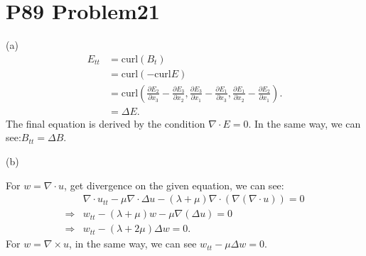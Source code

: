 \documentclass[a4paper]{ctexart}
\newcommand{\pdfFrac}[2]{\frac{\partial #1}{\partial #2}}
\begin{document}
\section*{P89 Problem21}
(a)
\begin{equation}
    \label{eq:Maxwell}
    \begin{aligned}
        E_{tt}&=\text{curl}(B_{t})\\
        &=\text{curl}(-\text{curl}E)\\
        &=\text{curl}(\pdfFrac{E_{2}}{x_{3}}-\pdfFrac{E_{3}}{x_{2}},\pdfFrac{E_{3}}{x_{1}}-\pdfFrac{E_{1}}{x_{3}},\pdfFrac{E_{1}}{x_{2}}-\pdfFrac{E_{2}}{x_{1}}).\\
        &=\Delta E.
    \end{aligned}
\end{equation}
The final equation is derived by the condition $\nabla\cdot E=0$. In the same way, we can see:$B_{tt}=\Delta B$.

(b)

For $w=\nabla\cdot u$, get divergence on the given equation, we can see:
\begin{equation}
    \begin{aligned}
        &\nabla\cdot u_{tt}-\mu\nabla\cdot\Delta u-(\lambda+\mu)\nabla\cdot(\nabla(\nabla\cdot u))=0\\
        \Rightarrow&w_{tt}-(\lambda+\mu)w-\mu\nabla(\Delta u)=0\\
        \Rightarrow& w_{tt}-(\lambda+2\mu)\Delta w=0.
    \end{aligned}
\end{equation}
For $w=\nabla\times u$, in the same way, we can see $w_{tt}-\mu\Delta w=0$.
\end{document}
